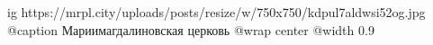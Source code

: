  
 
 
 
 

\ifcmt
  ig https://mrpl.city/uploads/posts/resize/w/750x750/kdpul7aldwsi52og.jpg
	@caption Мариимагдалиновская церковь
  @wrap center
  @width 0.9
\fi
